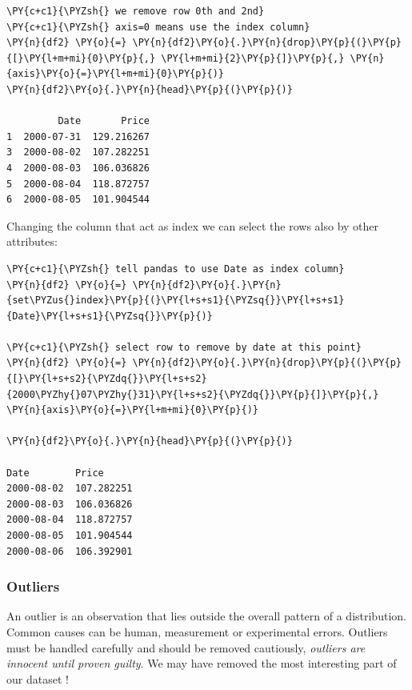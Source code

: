 \begin{tcolorbox}[breakable, size=fbox, boxrule=1pt, pad at break*=1mm,colback=cellbackground, colframe=cellborder]
\begin{Verbatim}[commandchars=\\\{\}]
\PY{c+c1}{\PYZsh{} we remove row 0th and 2nd}
\PY{c+c1}{\PYZsh{} axis=0 means use the index column}
\PY{n}{df2} \PY{o}{=} \PY{n}{df2}\PY{o}{.}\PY{n}{drop}\PY{p}{(}\PY{p}{[}\PY{l+m+mi}{0}\PY{p}{,} \PY{l+m+mi}{2}\PY{p}{]}\PY{p}{,} \PY{n}{axis}\PY{o}{=}\PY{l+m+mi}{0}\PY{p}{)}
\PY{n}{df2}\PY{o}{.}\PY{n}{head}\PY{p}{(}\PY{p}{)}

         Date       Price
1  2000-07-31  129.216267
3  2000-08-02  107.282251
4  2000-08-03  106.036826
5  2000-08-04  118.872757
6  2000-08-05  101.904544
\end{Verbatim}
\end{tcolorbox}
        
Changing the column that act as index we can select the rows also by other attributes:

\begin{tcolorbox}[breakable, size=fbox, boxrule=1pt, pad at break*=1mm,colback=cellbackground, colframe=cellborder]
\begin{Verbatim}[commandchars=\\\{\}]
\PY{c+c1}{\PYZsh{} tell pandas to use Date as index column}
\PY{n}{df2} \PY{o}{=} \PY{n}{df2}\PY{o}{.}\PY{n}{set\PYZus{}index}\PY{p}{(}\PY{l+s+s1}{\PYZsq{}}\PY{l+s+s1}{Date}\PY{l+s+s1}{\PYZsq{}}\PY{p}{)}

\PY{c+c1}{\PYZsh{} select row to remove by date at this point}
\PY{n}{df2} \PY{o}{=} \PY{n}{df2}\PY{o}{.}\PY{n}{drop}\PY{p}{(}\PY{p}{[}\PY{l+s+s2}{\PYZdq{}}\PY{l+s+s2}{2000\PYZhy{}07\PYZhy{}31}\PY{l+s+s2}{\PYZdq{}}\PY{p}{]}\PY{p}{,} \PY{n}{axis}\PY{o}{=}\PY{l+m+mi}{0}\PY{p}{)}

\PY{n}{df2}\PY{o}{.}\PY{n}{head}\PY{p}{(}\PY{p}{)}

Date        Price
2000-08-02  107.282251
2000-08-03  106.036826
2000-08-04  118.872757
2000-08-05  101.904544
2000-08-06  106.392901
\end{Verbatim}
\end{tcolorbox}
        
\subsubsection{Outliers}\label{outliers}

An outlier is an observation that lies outside the overall pattern of a distribution. 
Common causes can be human, measurement or experimental errors. Outliers must be handled carefully and should be removed cautiously, \emph{outliers are innocent until proven guilty}. We may have removed the most interesting part of our dataset !

